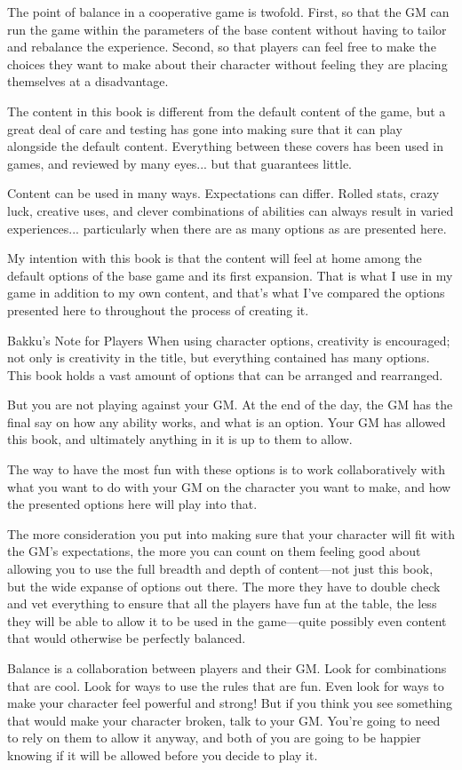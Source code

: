 \documentclass[11pt,twoside,openany]{book}  %
\begin{document}
The point of balance in a cooperative game is twofold. First, so that the GM can run the game within the parameters of the base content without having to tailor and rebalance the experience. Second, so that players can feel free to make the choices they want to make about their character without feeling they are placing themselves at a disadvantage.

The content in this book is different from the default content of the game, but a great deal of care and testing has gone into making sure that it can play alongside the default content. Everything between these covers has been used in games, and reviewed by many eyes... but that guarantees little.

Content can be used in many ways. Expectations can differ. Rolled stats, crazy luck, creative uses, and clever combinations of abilities can always result in varied experiences... particularly when there are as many options as are presented here.

My intention with this book is that the content will feel at home among the default options of the base game and its first expansion. That is what I use in my game in addition to my own content, and that’s what I’ve compared the options presented here to throughout the process of creating it.

\begin{CalloutBox}{Bakku's Note for Players}
When using character options, creativity is encouraged; not only is creativity in the title, but everything contained has many options. This book holds a vast amount of options that can be arranged and rearranged.

But you are not playing against your GM. At the end of the day, the GM has the final say on how any ability works, and what is an option. Your GM has allowed this book, and ultimately anything in it is up to them to allow.

The way to have the most fun with these options is to work collaboratively with what you want to do with your GM on the character you want to make, and how the presented options here will play into that.

The more consideration you put into making sure that your character will fit with the GM’s expectations, the more you can count on them feeling good about allowing you to use the full breadth and depth of content—not just this book, but the wide expanse of options out there. The more they have to double check and vet everything to ensure that all the players have fun at the table, the less they will be able to allow it to be used in the game—quite possibly even content that would otherwise be perfectly balanced.

Balance is a collaboration between players and their GM. Look for combinations that are cool. Look for ways to use the rules that are fun. Even look for ways to make your character feel powerful and strong! But if you think you see something that would make your character broken, talk to your GM. You’re going to need to rely on them to allow it anyway, and both of you are going to be happier knowing if it will be allowed before you decide to play it.
\end{CalloutBox}
\end{document}
